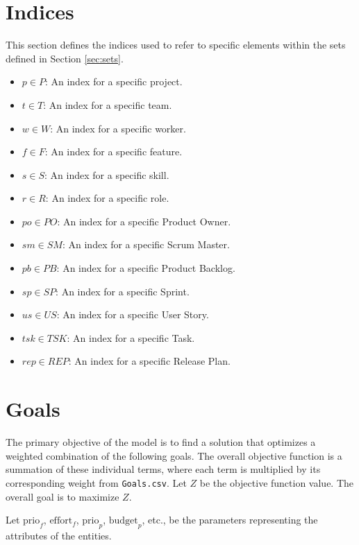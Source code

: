 \documentclass[11pt, a4paper]{article}
\begin{document}
\section{Indices}
\label{sec:indices}
This section defines the indices used to refer to specific elements within the sets defined in Section \ref{sec:sets}.

\begin{itemize}
    \item $p \in P$: An index for a specific project.
    \item $t \in T$: An index for a specific team.
    \item $w \in W$: An index for a specific worker.
    \item $f \in F$: An index for a specific feature.
    \item $s \in S$: An index for a specific skill.
    \item $r \in R$: An index for a specific role.
    \item $po \in PO$: An index for a specific Product Owner.
    \item $sm \in SM$: An index for a specific Scrum Master.
    \item $pb \in PB$: An index for a specific Product Backlog.
    \item $sp \in SP$: An index for a specific Sprint.
    \item $us \in US$: An index for a specific User Story.
    \item $tsk \in TSK$: An index for a specific Task.
    \item $rep \in REP$: An index for a specific Release Plan.
\end{itemize}

\section{Goals}
\label{sec:goals}
The primary objective of the model is to find a solution that optimizes a weighted combination of the following goals. The overall objective function is a summation of these individual terms, where each term is multiplied by its corresponding weight from \texttt{Goals.csv}. Let $Z$ be the objective function value. The overall goal is to maximize $Z$.

Let $\text{prio}_{f}$, $\text{effort}_{f}$, $\text{prio}_{p}$, $\text{budget}_{p}$, etc., be the parameters representing the attributes of the entities.
\end{document}
